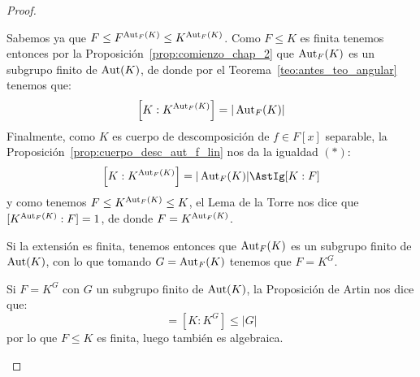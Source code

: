 \begin{teo}
\begin{proof}
\begin{description}
                Sabemos ya que $F\leq F^{\operatorname{Aut}_F(K)}\leq K^{\operatorname{Aut}_F(K)}$. Como $F\leq K$ es finita tenemos entonces por la Proposición~\ref{prop:comienzo_chap_2} que $\operatorname{Aut}_F(K)$ es un subgrupo finito de $\operatorname{Aut}(K)$, de donde por el Teorema~\ref{teo:antes_teo_angular} tenemos que:
                \begin{equation*}
                    \left[K:K^{\operatorname{Aut}_F(K)}\right] = |\operatorname{Aut}_F(K)|
                \end{equation*}
                Finalmente, como $K$ es cuerpo de descomposición de $f\in F[x]$ separable, la Proposición~\ref{prop:cuerpo_desc_aut_f_lin} nos da la igualdad $(\ast)$:
                \begin{equation*}
                    \left[K:K^{\Aut_F(K)}\right] = |\Aut_F(K)| \AstIg [K:F]
                \end{equation*}
                y como tenemos $F\leq K^{\operatorname{Aut}_F(K)}\leq K$, el Lema de la Torre nos dice que $[K^{\operatorname{Aut}_F(K)}:F] = 1$, de donde $F = K^{\operatorname{Aut}_F(K)}$.
            \item [$ii)\Longrightarrow iii)$] Si la extensión es finita, tenemos entonces que $\operatorname{Aut}_F(K)$ es un subgrupo finito de $\operatorname{Aut}(K)$, con lo que tomando $G= \operatorname{Aut}_F(K)$ tenemos que $F=K^G$.
            \item [$iii)\Longrightarrow iv)$] Si $F=K^G$ con $G$ un subgrupo finito de $\operatorname{Aut}(K)$, la Proposición de Artin nos dice que:
                \begin{equation*}
                    [K:F] = [K:K^G] \leq |G|
                \end{equation*}
                por lo que $F\leq K$ es finita, luego también es algebraica.


\end{description}
\end{proof}
\end{teo}
